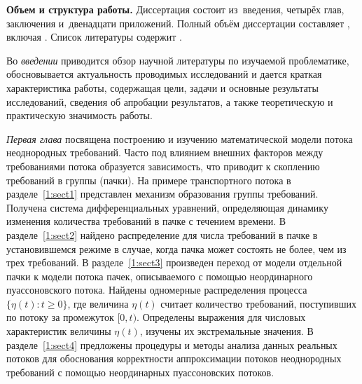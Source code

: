 
\textbf{Объем и структура работы.} Диссертация состоит из~введения, четырёх глав, заключения и~двенадцати приложений.
%
Полный объём диссертации составляет
, включая
. %
 Список литературы содержит  
.

Во \textit{введении} приводится обзор научной литературы по изучаемой проблематике, обосновывается актуальность проводимых исследований и дается краткая характеристика работы, содержащая цели, задачи и основные результаты исследований, сведения об апробации результатов, а также теоретическую и практическую значимость работы.

\textit{Первая глава} посвящена построению и изучению математической модели потока неоднородных требований. Часто под влиянием внешних факторов между требованиями потока образуется зависимость, что приводит к скоплению требований в группы (пачки). На примере транспортного потока в разделе~\ref{1:sect1} представлен механизм образования группы требований. Получена система дифференциальных уравнений, определяющая динамику изменения количества требований в пачке с течением времени. В разделе~\ref{1:sect2} найдено распределение для числа требований в пачке в установившемся режиме в случае, когда пачка может состоять не более, чем из трех требований. В разделе~\ref{1:sect3} произведен переход от модели отдельной пачки к модели потока пачек, описываемого с помощью неординарного пуассоновского потока. Найдены одномерные распределения процесса $\{\eta(t)\colon t\geq 0\}$, где величина $\eta(t)$ считает количество требований, поступивших по потоку за промежуток $[0, t)$. Определены выражения для числовых характеристик величины $\eta(t)$, изучены их экстремальные значения. В разделе~\ref{1:sect4} предложены процедуры и методы анализа данных реальных потоков для обоснования корректности аппроксимации потоков неоднородных требований с помощью неординарных пуассоновских потоков.

